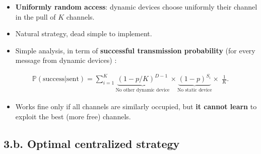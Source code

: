 \begin{frameO}

    \begin{itemize}\tightlist
        \item
              \textbf{Uniformly random access}: dynamic devices choose uniformly
              their channel in the pull of \(K\) channels.
        \item
              Natural strategy, dead simple to implement.
    \end{itemize}


    \begin{itemize}\tightlist
        \item
              Simple analysis, in term of \textbf{successful transmission
                  probability} (for every message from dynamic devices) :
    \end{itemize}

    \begin{small} \begin{align*}
            \mathbb{P}(\text{success}|\text{sent}) = \sum_{i=1}^{K} \underbrace{(1 - p / K)^{D-1}}_{\text{No other dynamic device}} \times \underbrace{(1-p)^{S_i}}_{\text{No static device}} \times\; \frac{1}{K}.
        \end{align*} \end{small}


    \begin{itemize}\tightlist
        \item
              Works fine only if all channels are similarly occupied,\newline
              but \textbf{it cannot learn} to exploit the best (more free)
              channels.
    \end{itemize}

\end{frameO}



\subsection{\hfill{}3.b. Optimal centralized strategy\hfill{}}

